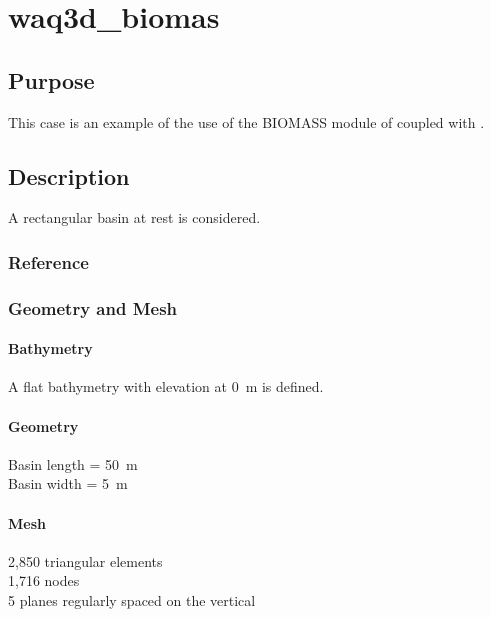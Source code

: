 \chapter{waq3d\_biomas}
%
%
\section{Purpose}
%
This case is an example of the use of the BIOMASS module of \waqtel coupled with .
%
\section{Description}
%
A rectangular basin at rest is considered.
%
%
%
%
\subsection{Reference}
%

%
%
%
\subsection{Geometry and Mesh}
%
\subsubsection{Bathymetry}
%
A flat bathymetry with elevation at 0~m is defined.
%
\subsubsection{Geometry}
%
Basin length = 50~m\\
Basin width = 5~m
%
\subsubsection{Mesh}
%
2,850 triangular elements\\
1,716 nodes\\
5 planes regularly spaced on the vertical
%
%
%
